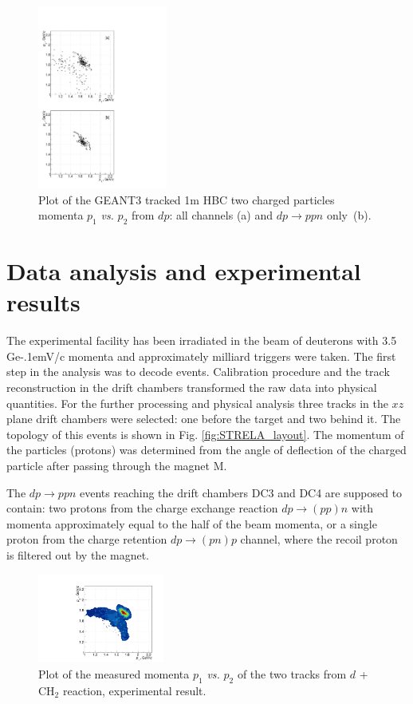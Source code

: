 \documentclass[twocolumn,epjc3]{svjour3}
\newcommand{\dpfrag} {\ensuremath{dp \rightarrow ppn}\xspace}
\newcommand{\dpchex} {\ensuremath{dp \rightarrow (pp)n}\xspace}
\newcommand{\dpret}  {\ensuremath{dp \rightarrow (pn)p}\xspace}
\newcommand{\GeVc}   {Ge\kern-.1emV/c\xspace}
\begin{document}
\begin{figure}[t]
  \centering
  \includegraphics[width=0.38\textwidth]{p1_vs_p2_1.pdf} %
  \caption{Plot of the GEANT3 tracked 1m HBC two charged particles momenta
    $p_1$ \textit{vs.} $p_2$ from $dp$: all channels (a) and \dpfrag only~(b).}
  \label{fig:p1vsp2_sim}
\end{figure}

\section{Data analysis and experimental results}
The experimental facility has been irradiated in the beam of deuterons with 3.5
\GeVc momenta and approximately milliard triggers were taken. The first step in
the analysis was to decode events. Calibration procedure and the track
reconstruction in the drift chambers transformed the raw data into physical
quantities. For the further processing and physical analysis three tracks in the
$xz$ plane drift chambers were selected: one before the target and two behind
it. The topology of this events is shown in Fig. \ref{fig:STRELA_layout}. The
momentum of the particles (protons) was determined from the angle of deflection
of the charged particle after passing through the magnet M.

The \dpfrag events reaching the drift chambers DC3 and DC4 are supposed
to contain: two protons from the charge exchange reaction \dpchex with momenta
approximately equal to the half of the beam momenta, or a single proton from the
charge retention \dpret channel, where the recoil proton is filtered out by the
magnet.

\begin{figure}[h]
  \centering
  \includegraphics[width=0.37\textwidth]{p1_vs_p2_2.pdf}
  \caption{Plot of the measured momenta $p_1$ \textit{vs.} $p_2$ of the two
    tracks from $d$ + CH$_{2}$ reaction, experimental result.}
  \label{fig:p1vsp2_exp}
\end{figure}
\end{document}

